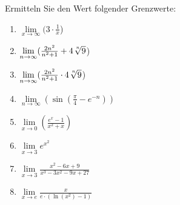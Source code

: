 \item Ermitteln Sie den Wert folgender Grenzwerte:

\begin{multicols}{3}
\begin{enumerate}
\item $\lim\limits_{x \to \infty} (3 \cdot \frac{1}{x}$)
\item $\lim\limits_{n \to \infty} (\frac{2n^2}{n^2+1} + 4\nroot{n}{9}$)
\item $\lim\limits_{n \to \infty} (\frac{2n^2}{n^2+1} \cdot 4\nroot{n}{9}$)
\item $\lim\limits_{n \to \infty} \left(\sin(\frac{\pi}{4}-e^{-n})\right)$
\item $\lim\limits_{x \to 0} (\frac{e^x-1}{x^2+x})$
\item $\lim\limits_{x \to 3} e^{x^2}$
\item $\lim\limits_{x \to 3} \frac{x^2-6x+9}{x^3-3x^2-9x+27}$
\item $\lim\limits_{x \to e} \frac{x}{e \cdot (\ln(x^2)-1)}$
\end{enumerate}
\end{multicols}

